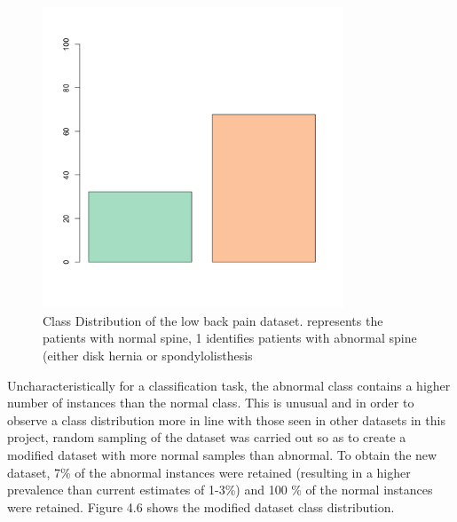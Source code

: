 \begin{figure}[H]
    \centering
    \includegraphics[width=0.8\textwidth]{ThesisTemplate/usingLatex/chapter4Images/figure4_12.png}
    \caption{Class Distribution of the low back pain dataset. represents the patients with normal spine, 1 identifies patients with abnormal spine (either disk hernia or spondylolisthesis }
    \label{fig:my_label}
\end{figure}

Uncharacteristically for a classification task, the abnormal class contains a higher number of instances than the normal class. This is unusual and in order to observe a class distribution more in line with those seen in other datasets in this project, random sampling of the dataset was  carried out so as to create a modified dataset with more normal samples than abnormal. To obtain the new dataset, 7\% of the abnormal instances were  retained (resulting in a higher prevalence than current estimates of 1-3\%) %
and 100 \% of the normal instances were retained. Figure 4.6 shows the modified dataset class distribution.

